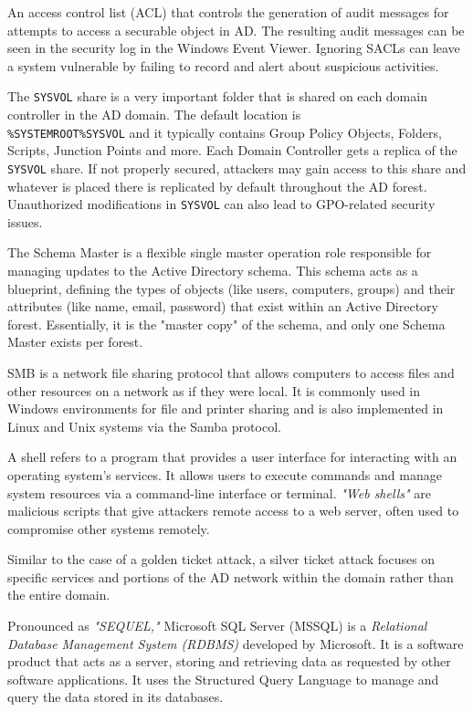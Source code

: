  An access control list (ACL) that controls the generation of audit messages for attempts to access a securable object in AD. The resulting audit messages can be seen in the security log in the Windows Event Viewer. Ignoring SACLs can leave a system vulnerable by failing to record and alert about suspicious activities.

 The \texttt{SYSVOL} share is a very important folder that is shared on each domain controller in the AD domain. The default location is \\\texttt{\%SYSTEMROOT\%SYSVOL} and it typically contains Group Policy Objects, Folders, Scripts, Junction Points and more. Each Domain Controller gets a replica of the \texttt{SYSVOL} share. If not properly secured, attackers may gain access to this share and whatever is placed there is replicated by default throughout the AD forest. Unauthorized modifications in \texttt{SYSVOL} can also lead to GPO-related security issues.

 The Schema Master is a flexible single master operation role responsible for managing updates to the Active Directory schema. This schema acts as a blueprint, defining the types of objects (like users, computers, groups) and their attributes (like name, email, password) that exist within an Active Directory forest. Essentially, it is the "master copy" of the schema, and only one Schema Master exists per forest.

 SMB is a network file sharing protocol that allows computers to access files and other resources on a network as if they were local. It is commonly used in Windows environments for file and printer sharing and is also implemented in Linux and Unix systems via the Samba protocol.

 A shell refers to a program that provides a user interface for interacting with an operating system's services. It allows users to execute commands and manage system resources via a command-line interface or terminal. \textit{"Web shells"} are malicious scripts that give attackers remote access to a web server, often used to compromise other systems remotely.

 Similar to the case of a golden ticket attack, a silver ticket attack focuses on specific services and portions of the AD network within the domain rather than the entire domain.

 Pronounced as \textit{"SEQUEL,"} Microsoft SQL Server (MSSQL) is a \textit{Relational Database Management System (RDBMS)} developed by Microsoft. It is a software product that acts as a server, storing and retrieving data as requested by other software applications. It uses the Structured Query Language to manage and query the data stored in its databases.

